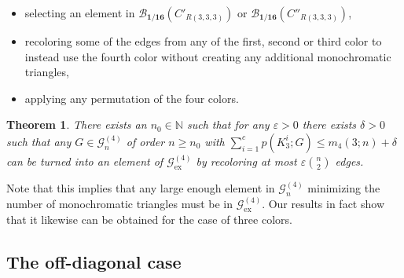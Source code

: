 \documentclass[a4paper,11pt]{article}
\newtheorem{theorem}{Theorem}[section]
\numberwithin{equation}{section}
\newcommand{\mB}{\mathcal{B}}
\newcommand{\mG}{\mathcal{G}}
\newcommand{\NN}{\mathbb{N}}
\begin{document}
\begin{itemize} \setlength\itemsep{0em}
    \item[(i)] selecting an element in $\mB_\mathbf{1/16} (C'_{R(3,3,3)} )$ or $\mB_\mathbf{1/16} (C''_{R(3,3,3)} )$,
    \item[(ii)] recoloring some of the edges from any of the first, second or third color to instead use the fourth color without creating any additional monochromatic triangles,
    \item[(iii)] applying any permutation of the four colors.
\end{itemize}

%
\begin{theorem} \label{eq:fourcolortriangles}
    There exists an $n_0 \in \NN$ such that for any $\varepsilon > 0$ there exists $\delta > 0$ such that any $G \in \mG_n^{(4)}$ of order $n \geq n_0$ with $\sum_{i=1}^cp(K_3^i; G) \leq m_4(3; n) + \delta$ can be turned into an element of $\mG^{(4)}_\textrm{ex}$ by recoloring at most $\varepsilon \binom{n}{2}$ edges.
\end{theorem}
%
Note that this implies that any large enough element in $\mG_n^{(4)}$ minimizing the number of monochromatic triangles must be in $\mG^{(4)}_\textrm{ex}$. Our results in fact show that it likewise can be obtained for the case of three colors.



\subsection{The off-diagonal case}
\end{document}
